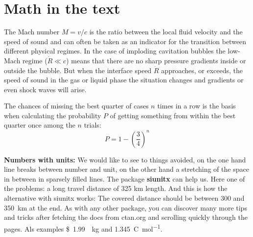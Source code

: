 \chapter{Math in the text}%

The Mach number $M=v/c$ is the ratio between the local fluid velocity and the speed of sound and can often be taken as an indicator for the transition between different physical regimes. In the case of imploding cavitation bubbles the low-Mach regime ($\dot{R}\ll c$) means that there are no sharp pressure gradients inside or outside the bubble. But when the interface speed $\dot{R}$ approaches, or exceeds, the speed of sound in the gas or liquid phase the situation changes and gradients or even shock waves will arise.

The chances of missing the best quarter of cases $n$ times in a row is the basis when calculating the probability $P$ of getting something from within the best quarter once among the $n$ trials:
\begin{equation}
P=1-\left( \frac{3}{4} \right)^n
\end{equation}


\textbf{Numbers with units:} We would like to see to things avoided, on the one hand line breaks between number and unit, on the other hand a stretching of the space in between in sparsely filled lines. The package \textbf{siunitx} can help us. Here one of the problems: a long travel distance of 325 km length. And this is how the alternative with siunitx works: The covered distance should be between \num{300} and \SI{350}{\kilo\meter} at the end. As with any other package, you can discover many more tips and tricks after fetching the docs from ctan.org and scrolling quickly through the pages. Als examples \SI[per-mode=symbol]{1.99}[\$]{\per\kilogram} and \SI[per-mode=fraction]{1,345}{\coulomb\per\mole}.
